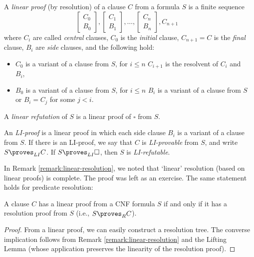 \begin{definition}
    A \emph{linear proof} (by resolution) of a clause $C$ from a formula $S$ is a finite sequence
    $$
    \begin{bmatrix}
        C_0 \\
        B_0
    \end{bmatrix},
    \begin{bmatrix}
        C_1 \\
        B_1
    \end{bmatrix},\dots,
    \begin{bmatrix}
        C_n \\
        B_n
    \end{bmatrix},
    C_{n+1}
    $$
    where $C_i$ are called \emph{central} clauses, $C_0$ is the \emph{initial} clause, $C_{n+1}=C$ is the \emph{final} clause, $B_i$ are \emph{side} clauses, and the following hold:
    \begin{itemize}
        \item $C_0$ is a variant of a clause from $S$, for $i\leq n$ $C_{i+1}$ is the resolvent of $C_i$ and $B_i$,
        \item $B_0$ is a variant of a clause from $S$, for $i\leq n$ $B_i$ is a variant of a clause from $S$ or $B_i=C_j$ for some $j<i$. 
    \end{itemize}
    A \emph{linear refutation} of $S$ is a linear proof of $\square$ from $S$.
    
    An \emph{LI-proof} is a linear proof in which each side clause $B_i$ is a variant of a clause from $S$. If there is an LI-proof, we say that $C$ is \emph{LI-provable} from $S$, and write $S\proves_{LI}C$. If $S\proves_{LI}\square$, then $S$ is \emph{LI-refutable}.
\end{definition}

In Remark \ref{remark:linear-resolution}, we noted that `linear' resolution (based on linear proofs) is complete. The proof was left as an exercise. The same statement holds for predicate resolution:

\begin{theorem}
A clause $C$ has a linear proof from a CNF formula $S$ if and only if it has a resolution proof from $S$ (i.e., $S\proves_R C$).
\end{theorem}
\begin{proof}
From a linear proof, we can easily construct a resolution tree. The converse implication follows from Remark \ref{remark:linear-resolution} and the Lifting Lemma (whose application preserves the linearity of the resolution proof).
\end{proof}

